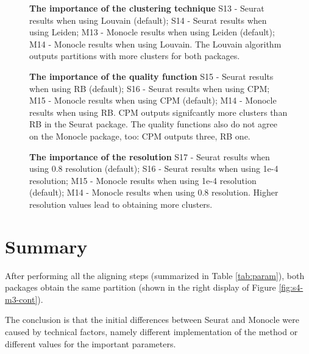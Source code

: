 \begin{landscape}
\begin{figure}[H]
    \centering
    \caption{\label{fig:s4-m3-graph-alg}\textbf{The importance of the clustering technique} S13 - Seurat results when using Louvain (default); S14 - Seurat results when using Leiden; M13 - Monocle results when using Leiden (default); M14 - Monocle results when using Louvain. The Louvain algorithm outputs partitions with more clusters for both packages. }
\end{figure}

\begin{figure}[H]
    \centering
    \caption{\label{fig:s4-m3-quality}\textbf{The importance of the quality function} S15 - Seurat results when using RB (default); S16 - Seurat results when using CPM; M15 - Monocle results when using CPM (default); M14 - Monocle results when using RB. CPM outputs signifcantly more clusters than RB in the Seurat package. The quality functions also do not agree on the Monocle package, too: CPM outputs three, RB one. }
\end{figure}

\begin{figure}[H]
    \centering
    \caption{\label{fig:s4-m3-res}\textbf{The importance of the resolution} S17 - Seurat results when using 0.8 resolution (default); S16 - Seurat results when using 1e-4 resolution; M15 - Monocle results when using 1e-4 resolution (default); M14 - Monocle results when using 0.8 resolution. Higher resolution values lead to obtaining more clusters.}
\end{figure}
\end{landscape}

\section{Summary}
After performing all the aligning steps (summarized in Table \ref{tab:param}), both packages obtain the same partition (shown in the right display of Figure \ref{fig:s4-m3-cont}).

The conclusion is that the initial differences between Seurat and Monocle were caused by technical factors, namely different implementation of the method or different values for the important parameters.

